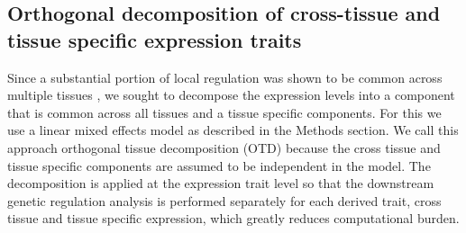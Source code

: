 \documentclass[10pt,letterpaper]{article}
\begin{document}


\subsection*{Orthogonal decomposition of cross-tissue and tissue specific expression traits}

Since a substantial portion of local regulation was shown to be common across multiple tissues \cite{Ardlie_2015}, we sought to decompose the expression levels into a component that is common across all tissues and a tissue specific components. For this we use a linear mixed effects model as described in the Methods section. We call this approach orthogonal tissue decomposition (OTD) because the cross tissue and tissue specific components are assumed to be independent in the model. The decomposition is applied at the expression trait level so that the downstream genetic regulation analysis is performed separately for each derived trait, cross tissue and tissue specific expression, which greatly reduces computational burden. 
\end{document}
